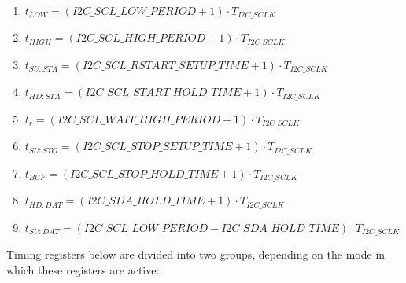 \documentclass[main\_\_EN.tex]{subfiles}
\begin{document}
\begin{enumerate}
\item   $t_{LOW} = (\hyperref[fielddesc:I2CSCLLOWPERIOD]{I2C\_SCL\_LOW\_PERIOD} + 1) \cdot  T_{I2C\_SCLK}$

\item   $t_{HIGH} = (\hyperref[fielddesc:I2CSCLHIGHPERIOD]{I2C\_SCL\_HIGH\_PERIOD} + 1) \cdot  T_{I2C\_SCLK}$

\item   $t_{SU:STA} = (\hyperref[fielddesc:I2CSCLRSTARTSETUPTIME]{I2C\_SCL\_RSTART\_SETUP\_TIME} + 1) \cdot  T_{I2C\_SCLK}$

\item   $t_{HD:STA} = (\hyperref[fielddesc:I2CSCLSTARTHOLDTIME]{I2C\_SCL\_START\_HOLD\_TIME} +1) \cdot  T_{I2C\_SCLK}$

\item   $t_{r} = (\hyperref[fielddesc:I2CSCLWAITHIGHPERIOD]{I2C\_SCL\_WAIT\_HIGH\_PERIOD} + 1 ) \cdot  T_{I2C\_SCLK}$

\item   $t_{SU:STO} = (\hyperref[fielddesc:I2CSCLSTOPSETUPTIME]{I2C\_SCL\_STOP\_SETUP\_TIME}  + 1) \cdot  T_{I2C\_SCLK}$

\item   $t_{BUF} = (\hyperref[fielddesc:I2CSCLSTOPHOLDTIME]{I2C\_SCL\_STOP\_HOLD\_TIME}  + 1) \cdot  T_{I2C\_SCLK}$

\item   $t_{HD:DAT} = (\hyperref[fielddesc:I2CSDAHOLDTIME]{I2C\_SDA\_HOLD\_TIME} +1) \cdot  T_{I2C\_SCLK}$

\item   $t_{SU:DAT} = (\hyperref[fielddesc:I2CSCLLOWPERIOD]{I2C\_SCL\_LOW\_PERIOD} - \hyperref[fielddesc:I2CSDAHOLDTIME]{I2C\_SDA\_HOLD\_TIME}) \cdot  T_{I2C\_SCLK}$
\end{enumerate}

Timing registers below are divided into two groups, depending on the mode in which these registers are active:
\end{document}
